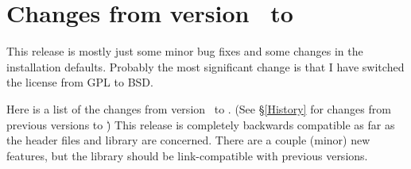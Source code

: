 
\section{Changes from version \prevtmvversion\ to \tmvversion}
\label{Changes}

This release is mostly just some minor bug fixes and some changes in the 
installation defaults.  Probably the most significant change is that I have
switched the license from GPL to BSD.  

Here is a list of the changes from version \prevtmvversion\ to \tmvversion.  
(See \S\ref{History} for changes from previous versions to \prevtmvversion\.)
This release is completely backwards compatible as far as the header files and library are 
concerned.  There are a couple (minor) new features, but the library should be link-compatible
with previous versions.

